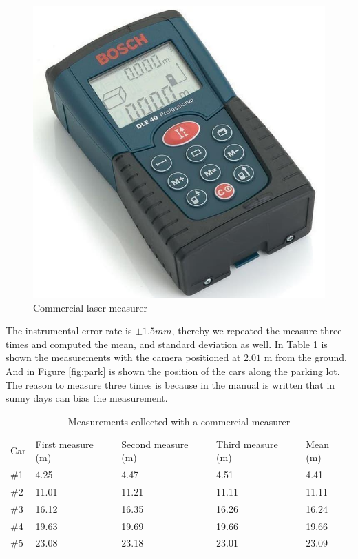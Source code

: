\begin{figure}[H]
\centering
\includegraphics[scale=0.3]{imagens/trena.jpg}
\caption{Commercial laser measurer}
\label{fig:laser_meas}
\end{figure}

The instrumental error rate is $\pm 1.5 mm$, thereby we repeated the measure three times and computed the mean, and standard deviation as well. In Table \ref{tab:tab_measure} is shown the measurements with the camera positioned at $2.01$ m from the ground. And in Figure \ref{fig:park} is shown the position of the cars along the parking lot. The reason to measure three times is because in the manual is written that in sunny days can bias the measurement. 



\begin{table}[H]
\centering
\caption{Measurements collected with a commercial measurer}
\begin{tabular}{l|l|l|l|l} 
\toprule
Car & First measure (m) & Second measure (m) & Third measure (m) & Mean (m) \\
\#1   & 4.25          & 4.47           & 4.51           & 4.41 \\
\#2   & 11.01         & 11.21          & 11.11          & 11.11\\
\#3   & 16.12         & 16.35          & 16.26          & 16.24\\
\#4   & 19.63         & 19.69          & 19.66          & 19.66\\
\#5   & 23.08         & 23.18          & 23.01          & 23.09\\
\bottomrule
\end{tabular}
\label{tab:tab_measure}
\end{table} 


